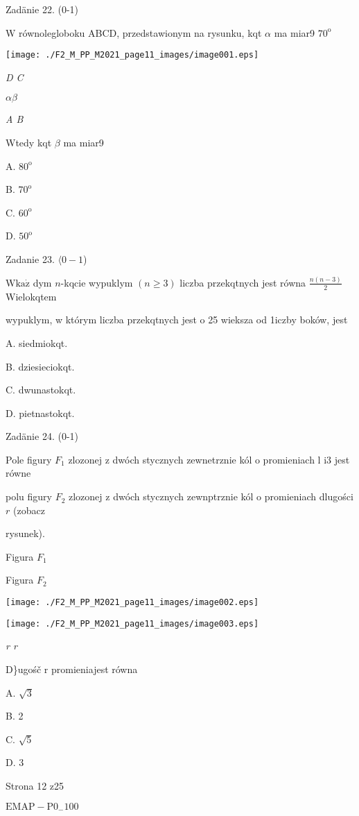 \documentclass[a4paper,12pt]{article}
\begin{document}
Zadänie 22. (0-1)

$\mathrm{W}$ równolegloboku ABCD, przedstawionym na rysunku, kqt $\alpha$ ma miar9 $70^{\mathrm{o}}$
\begin{center}
\texttt{[image: ./F2\_M\_PP\_M2021\_page11\_images/image001.eps]}
\end{center}
{\it D  C}

$\alpha  \beta$

{\it A  B}

Wtedy kqt $\beta$ ma miar9

A. $80^{\mathrm{o}}$

B. $70^{\mathrm{o}}$

C. $60^{\mathrm{o}}$

D. $50^{\mathrm{o}}$

Zadanie 23. $\langle 0-1$)

$\mathrm{W}\mathrm{k}\mathrm{a}\dot{\mathrm{z}}$ dym $n$-kqcie wypuklym $(n\geq 3)$ liczba przekqtnych jest równa $\displaystyle \frac{n(n-3)}{2}$ Wielokqtem

wypuklym, w którym liczba przekqtnych jest o 25 wieksza od 1iczby boków, jest

A. siedmiokqt.

B. dziesieciokqt.

C. dwunastokqt.

D. pietnastokqt.

Zadänie 24. (0-1)

Pole figury $F_{1}$ zlozonej z dwóch stycznych zewnetrznie kól o promieniach l $\mathrm{i} 3$ jest równe

polu figury $F_{2}$ zlozonej z dwóch stycznych zewnptrznie kól o promieniach dlugości $r$ (zobacz

rysunek).

Figura $F_{1}$

Figura $F_{2}$
\begin{center}
\texttt{[image: ./F2\_M\_PP\_M2021\_page11\_images/image002.eps]}

\texttt{[image: ./F2\_M\_PP\_M2021\_page11\_images/image003.eps]}
\end{center}
{\it r r}

D\}ugośč r promieniajest równa

A. $\sqrt{3}$

B. 2

C. $\sqrt{5}$

D. 3

Strona 12 z25

$\mathrm{E}\mathrm{M}\mathrm{A}\mathrm{P}-\mathrm{P}0_{-}100$
\end{document}
